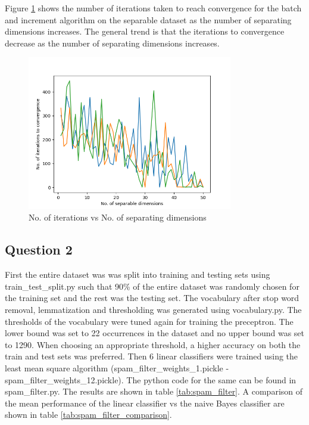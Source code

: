 \documentclass[12pt]{article}
\begin{document}
Figure \ref{fig:separating_dimensions} shows the number of iterations taken to reach convergence for the batch and increment algorithm on the separable dataset as the number of separating dimensions increases. The general trend is that the iterations to convergence decrease as the number of separating dimensions increases.

\begin{figure}[H]
  \centering
  \includegraphics[width=0.8\textwidth]{Figure_1.png}
  \caption{No. of iterations vs No. of separating dimensions}
  \label{fig:separating_dimensions}
\end{figure}

\newpage

\subsection*{Question 2}

First the entire dataset was was split into training and testing sets using train\_test\_split.py such that 90\% of the entire dataset was randomly chosen for the training set and the rest was the testing set. The vocabulary after stop word removal, lemmatization and thresholding was generated using vocabulary.py. The thresholds of the vocabulary were tuned again for training the preceptron. The lower bound was set to 22 occurrences in the dataset and no upper bound was set to 1290. When choosing an appropriate threshold, a higher accuracy on both the train and test sets was preferred. Then 6 linear classifiers were trained using the least mean square algorithm (spam\_filter\_weights\_1.pickle - spam\_filter\_weights\_12.pickle). The python code for the same can be found in spam\_filter.py. The results are shown in table \ref{tab:spam_filter}. A comparison of the mean performance of the linear classifier vs the naive Bayes classifier are shown in table \ref{tab:spam_filter_comparison}.
\end{document}
